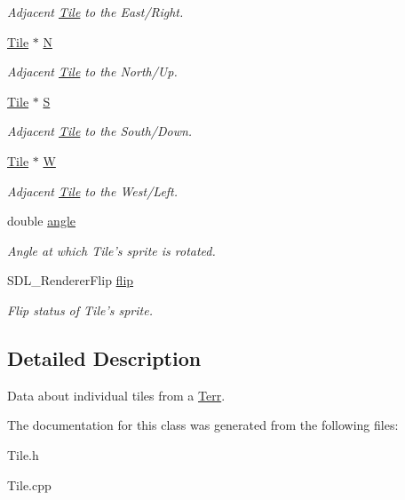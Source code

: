 \begin{DoxyCompactItemize}
\begin{DoxyCompactList}\small\item\em Adjacent \hyperlink{class_tile}{Tile} to the East/\+Right. \end{DoxyCompactList}\item 
\hyperlink{class_tile}{Tile} $\ast$ \hyperlink{class_tile_af1255bd2dba8dfa019fcd65a05805ed1}{N}\hypertarget{class_tile_af1255bd2dba8dfa019fcd65a05805ed1}{}\label{class_tile_af1255bd2dba8dfa019fcd65a05805ed1}

\begin{DoxyCompactList}\small\item\em Adjacent \hyperlink{class_tile}{Tile} to the North/\+Up. \end{DoxyCompactList}\item 
\hyperlink{class_tile}{Tile} $\ast$ \hyperlink{class_tile_adc655f39bc82d9b5898b991faea9df42}{S}\hypertarget{class_tile_adc655f39bc82d9b5898b991faea9df42}{}\label{class_tile_adc655f39bc82d9b5898b991faea9df42}

\begin{DoxyCompactList}\small\item\em Adjacent \hyperlink{class_tile}{Tile} to the South/\+Down. \end{DoxyCompactList}\item 
\hyperlink{class_tile}{Tile} $\ast$ \hyperlink{class_tile_ae992c1605ed059cb9eaff737b99824dc}{W}\hypertarget{class_tile_ae992c1605ed059cb9eaff737b99824dc}{}\label{class_tile_ae992c1605ed059cb9eaff737b99824dc}

\begin{DoxyCompactList}\small\item\em Adjacent \hyperlink{class_tile}{Tile} to the West/\+Left. \end{DoxyCompactList}\item 
double \hyperlink{class_tile_a33219999fbd38d9c9e8e98d09a9b65a5}{angle}\hypertarget{class_tile_a33219999fbd38d9c9e8e98d09a9b65a5}{}\label{class_tile_a33219999fbd38d9c9e8e98d09a9b65a5}

\begin{DoxyCompactList}\small\item\em Angle at which Tile’s sprite is rotated. \end{DoxyCompactList}\item 
S\+D\+L\+\_\+\+Renderer\+Flip \hyperlink{class_tile_a815af374aa83cd0be79bb5553056b15e}{flip}\hypertarget{class_tile_a815af374aa83cd0be79bb5553056b15e}{}\label{class_tile_a815af374aa83cd0be79bb5553056b15e}

\begin{DoxyCompactList}\small\item\em Flip status of Tile’s sprite. \end{DoxyCompactList}\end{DoxyCompactItemize}


\subsection{Detailed Description}
Data about individual tiles from a \hyperlink{class_terr}{Terr}. 

The documentation for this class was generated from the following files\+:\begin{DoxyCompactItemize}
\item 
Tile.\+h\item 
Tile.\+cpp\end{DoxyCompactItemize}
